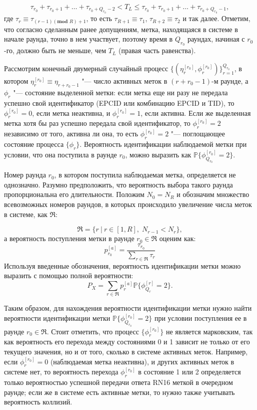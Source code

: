 $$
\tau_{r_0} + \tau_{r_0 + 1} + \dots + \tau_{r_0 + Q_{r_0} - 2} < T_L \leqslant \tau_{r_0} + \tau_{r_0 + 1} + \dots + \tau_{r_0 + Q_{r_0} - 1},
$$
где $\tau_{r} \equiv \tau_{(r - 1)(\textbf{mod } R) + 1}$, то есть $\tau_{R+1} \equiv \tau_1$, $\tau_{R+2} \equiv \tau_2$ и так далее. Отметим, что согласно сделанным ранее допущениям, метка, находящаяся в системе в начале раунда, точно в нем участвует, поэтому время в $Q_{r_0}$ раундах, начиная с $r_0$-го, должно быть не меньше, чем $T_L$ (правая часть равенства).

Рассмотрим конечный двумерный случайный процесс $\{ (\eta_r^{[r_0]}, \phi_r^{[r_0]}) \}_{r=1}^{Q_{r_0}}$, в котором $\eta_r^{[r_0]} \equiv \eta_{r+r_0-1}$ "--- число активных меток в $(r + r_0 - 1)$-м раунде, а $\phi_r$ "--- состояние выделенной метки: если метка еще ни разу не передала успешно свой идентификатор (EPCID или комбинацию EPCID и TID), то $\phi_r^{[r_0]} = 0$, если метка неактивна, и $\phi_r^{[r_0]} = 1$, если активна. Если же выделенная метка хотя бы раз успешно передала свой идентификатор, то $\phi_r^{[r_0]} = 2$ независимо от того, активна ли она, то есть $\phi_r^{[r_0]} = 2$ "--- поглощающее состояние процесса $\{ \phi_r \}$. Вероятность идентификации наблюдаемой метки при условии, что она поступила в раунде $r_0$, можно выразить как $\mathbb{P}\{ \phi_{Q_{r_0}}^{[r_0]} = 2\}$.

Номер раунда $r_0$, в котором поступила наблюдаемая метка, определяется не однозначно. Разумно предположить, что вероятность выбора такого раунда пропорциональна его длительности. Положим $N_0 = N_R$ и обозначим множество всевозможных номеров раундов, в которых происходило увеличение числа меток в системе, как $\mathfrak{R}$:

$$
	\mathfrak{R} = \{ r\:|\:r \in [1, R],\; N_{r-1} < N_r \},
$$
а вероятность поступления метки в раунде $r_0 \in \mathfrak{R}$ оценим как:
\begin{equation}\label{eq:ch3_fg_prob_arrival}
	p^{[a]}_{r_0} = \frac{\tau_{r_0}}{\sum_{r \in \mathfrak{R}} \tau_r}
\end{equation}
Используя введенные обозначения, вероятность идентификации метки можно выразить с помощью полной вероятности:
\begin{equation}\label{eq:ch3_tag_id_prob_phi}
	P_X = \sum\limits_{r \in \mathfrak{R}} p^{[a]}_r \mathbb{P}\{ \phi^{[r]}_{Q_r} = 2 \}.
\end{equation}

Таким образом, для нахождения вероятности идентификации метки нужно найти вероятности идентификации метки $\mathbb{P}\{ \phi^{[r_0]}_{Q_{r_0}} = 2 \}$ при условии поступления ее в раунде $r_0 \in \mathfrak{R}$. Стоит отметить, что процесс $\{ \phi^{[r_0]}_r \}$ не является марковским, так как вероятность его перехода между состояниями 0 и 1 зависит не только от его текущего значения, но и от того, сколько в системе активных меток. Например, если $\phi_r^{[r_0]} = 0$ (наблюдаемая метка неактивна), и других активных меток в системе нет, то вероятность перехода $\phi_r^{[r_0]}$ в состояние 1 или 2 определяется только вероятностью успешной передачи ответа RN16 меткой в очередном раунде; если же в системе есть активные метки, то нужно также учитывать вероятность коллизий.



